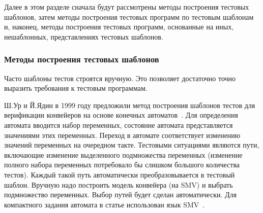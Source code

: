 Далее в этом разделе сначала будут рассмотрены методы построения тестовых шаблонов, затем методы построения тестовых программ по тестовым шаблонам и, наконец, методы построения тестовых программ, основанные на иных, нешаблонных, представлениях тестовых шаблонов.


\subsubsection{Методы построения тестовых шаблонов}%

Часто шаблоны тестов строятся вручную. Это позволяет достаточно точно выразить требования к тестовым программам.

Ш.Ур и Й.Ядин в 1999 году предложили метод построения шаблонов тестов для верификации конвейеров на основе конечных автоматов~\cite{UrFSM}. Для определения автомата вводится набор переменных, состояние автомата представляется значениями этих переменных. Переход в автомате соответствует изменению значений переменных на очередном такте. Тестовыми ситуациями являются пути, включающие изменение выделенного подмножества переменных (изменение полного набора переменных потребовало бы слишком большого количества тестов). Каждый такой путь автоматически преобразовывается в тестовый шаблон. Вручную надо построить модель конвейера (на SMV) и выбрать подмножество переменных. Выбор путей будет сделан автоматически. Для компактного задания автомата в статье использован язык SMV~\cite{SMV}.


